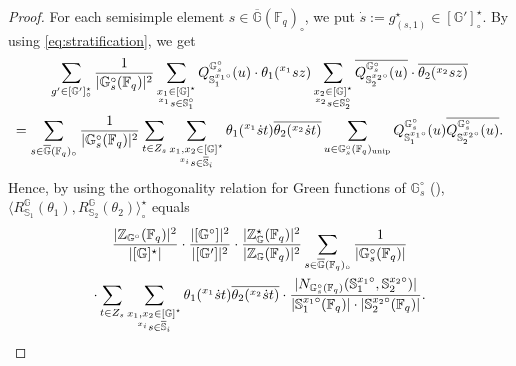 \documentclass{amsart}
\newcommand{\unip}{\mathrm{unip}}
\newcommand{\F}{\mathbb{F}}
\newcommand{\bbS}{\mathbb{S}}
\newcommand{\bbG}{\mathbb{G}}
\newcommand{\bbZ}{\mathbb{Z}}
\theoremstyle{plain}
\theoremstyle{definition}
\theoremstyle{remark}
\theoremstyle{theorem}
\begin{document}
\begin{proof}
For each semisimple element $s\in\overline{\bbG}(\F_{q})_{\circ}$, we put $\dot{s}:=g^{\star}_{(s,1)}\in[\bbG']^{\star}_{\circ}$.
By using \eqref{eq:stratification}, we get
\begin{multline*}
\sum_{g'\in[\bbG']^{\star}_{\circ}}
\frac{1}{|\bbG_{s}^{\circ}(\F_{q})|^{2}}
\sum_{\begin{subarray}{c}x_{1}\in [\bbG]^{\star} \\ {}^{x_{1}}s\in\bbS_{1}^{\circ}\end{subarray}}
Q^{\bbG^{\circ}_{s}}_{\bbS_{1}^{x_{1}\circ}}(u)\cdot \theta_{1}({}^{x_{1}}sz)
\sum_{\begin{subarray}{c}x_{2}\in [\bbG]^{\star} \\ {}^{x_{2}}s\in\bbS_{2}^{\circ}\end{subarray}}
\overline{Q^{\bbG^{\circ}_{s}}_{\bbS_{2}^{x_{2}\circ}}(u)}\cdot\overline{\theta_{2}({}^{x_{2}}sz)}\\
=
\sum_{s\in\overline{\bbG}(\F_{q})_{\circ}}
\frac{1}{|\bbG_{s}^{\circ}(\F_{q})|^{2}}
\sum_{t\in Z_{s}}
\sum_{\begin{subarray}{c}x_{1},x_{2}\in[\bbG]^{\star}\\ {}^{x_{i}}s\in\overline{\bbS}_{i}\end{subarray}}
\theta_{1}({}^{x_{1}}\dot{s}t)\overline{\theta_{2}({}^{x_{2}}\dot{s}t)}
\sum_{u\in\bbG_{s}^{\circ}(\F_{q})_{\unip}}
Q_{\bbS_{1}^{x_{1}\circ}}^{\bbG_{s}^{\circ}}(u)\overline{Q_{\bbS_{2}^{x_{2}\circ}}^{\bbG_{s}^{\circ}}(u)}.
\end{multline*}
Hence, by using the orthogonality relation for Green functions of $\bbG_{s}^{\circ}$ (\cite[Theorem 6.9]{DL76}),
$\langle R_{\bbS_1}^{\bbG}(\theta_1),R_{\bbS_2}^{\bbG}(\theta_2)\rangle^{\star}_{\circ}$ equals
\begin{multline*}
\frac{|\bbZ_{\bbG^{\circ}}(\F_{q})|^{2}}{|[\bbG]^{\star}|}
\cdot\frac{|[\bbG^{\circ}]|^{2}}{|[\bbG']|^{2}}
\cdot\frac{|\bbZ^{\star}_{\bbG}(\F_{q})|^{2}}{|\bbZ_{\bbG}(\F_{q})|^{2}}
\sum_{s\in\overline{\bbG}(\F_{q})_{\circ}}
\frac{1}{|\bbG_{s}^{\circ}(\F_{q})|}\\
\cdot\sum_{t\in Z_{s}}
\sum_{\begin{subarray}{c}x_{1},x_{2}\in[\bbG]^{\star}\\ {}^{x_{i}}s\in\overline{\bbS}_{i}\end{subarray}}
\theta_{1}({}^{x_{1}}\dot{s}t)\overline{\theta_{2}({}^{x_{2}}\dot{s}t)}
\cdot\frac{|N_{\bbG_{s}^{\circ}(\F_{q})}(\bbS_{1}^{x_{1}\circ},\bbS_{2}^{x_{2}\circ})|}{|\bbS_{1}^{x_{1}\circ}(\F_{q})|\cdot|\bbS_{2}^{x_{2}\circ}(\F_{q})|}.

\end{multline*}
\end{proof}
\end{document}
